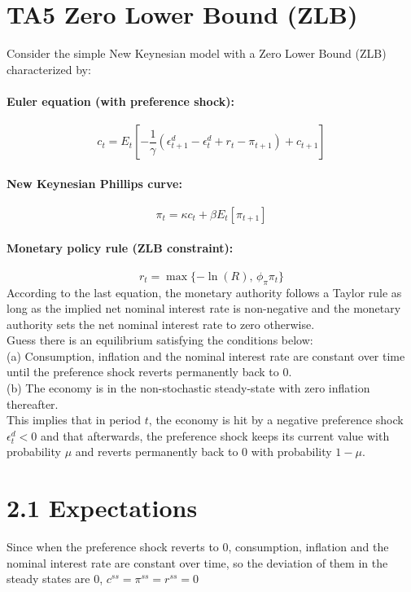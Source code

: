 \documentclass{article}
\begin{document}
\section*{TA5 Zero Lower Bound (ZLB)}

Consider the simple New Keynesian model with a Zero Lower Bound (ZLB) characterized by:

\paragraph{Euler equation (with preference shock):}
\[
c_t = E_t\left[-\frac{1}{\gamma}(\epsilon_{t+1}^d - \epsilon_t^d + r_t - \pi_{t+1}) + c_{t+1}\right]
\]

\paragraph{New Keynesian Phillips curve:}
\[
\pi_t = \kappa c_t + \beta E_t[\pi_{t+1}]
\]

\paragraph{Monetary policy rule (ZLB constraint):}
\[
r_t = \max\{-\ln(R),\, \phi_{\pi}\pi_t\}
\]
According to the last equation, the monetary authority follows a Taylor rule as long as the
implied net nominal interest rate is non-negative and the monetary authority sets the net
nominal interest rate to zero otherwise.\\
Guess there is an equilibrium satisfying the conditions below:\\
(a) Consumption, inflation and the nominal interest rate are constant over time until the
preference shock reverts permanently back to 0.\\
(b) The economy is in the non-stochastic steady-state with zero inflation thereafter.\\
This implies that in period $t$, the economy is hit by a negative preference shock $\epsilon_t^d
< 0$ and that afterwards, the preference shock keeps its current value with probability $\mu$ and reverts permanently back to $0$ with probability $1-\mu$.

\section*{2.1 Expectations}
Since when the preference shock reverts to 0, consumption, inflation and the nominal interest rate are constant over time, so the deviation of them in the steady states are $0$, $c^{ss}=\pi^{ss}=r^{ss}=0$
\end{document}
